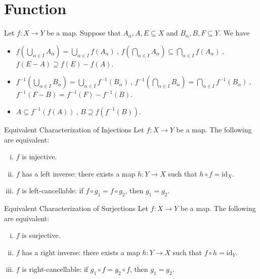 \section{Function}
\begin{proposition}{}{}
Let $f:X\to Y$ be a map. Suppose that $A_\alpha,A,E\subseteq X$ and $B_\alpha,B,F\subseteq Y$. We have
\begin{itemize}


	\item $f\left(\bigcup\limits_{\alpha\in I}A_\alpha\right)=\bigcup\limits_{\alpha\in I}f\left(A_\alpha\right)\ $, $f\left(\bigcap\limits_{\alpha\in I}A_\alpha\right)\subseteq\bigcap\limits_{\alpha\in I}f\left(A_\alpha\right)\ $, $f(E-A)\supseteq f(E)-f(A)$.
	\item $f^{-1}\left(\bigcup\limits_{\alpha\in I}B_\alpha\right)=\bigcup\limits_{\alpha\in I}f^{-1}\left(B_\alpha\right)\ $, $f^{-1}\left(\bigcap\limits_{\alpha\in I}B_\alpha\right)=\bigcap\limits_{\alpha\in I}f^{-1}\left(B_\alpha\right)\ $, $f^{-1}(F-B)=f^{-1}(F)-f^{-1}(B)$.
	\item $A\subseteq f^{-1}(f(A))\ $, $B\supseteq f(f^{-1}(B))$.
\end{itemize}
\end{proposition}

\begin{proposition}{Equivalent Characterization of Injections}{}
    Let $f:X\to Y$ be a map. The following are equivalent:
    \begin{enumerate}[(i)]
        \item $f$ is injective.
        \item $f$ has a left inverse: there exists a map $h:Y\to X$ such that $h\circ f=\mathrm{id}_X$.
        \item $f$ is left-cancellable: if $f\circ g_1=f\circ g_2$, then $g_1=g_2$.
    \end{enumerate}
\end{proposition}

\begin{proposition}{Equivalent Characterization of Surjections}{}
    Let $f:X\to Y$ be a map. The following are equivalent:
    \begin{enumerate}[(i)]
        \item $f$ is surjective.
        \item $f$ has a right inverse: there exists a map $h:Y\to X$ such that $f\circ h=\mathrm{id}_Y$.
        \item $f$ is right-cancellable: if $g_1\circ f=g_2\circ f$, then $g_1=g_2$.
    \end{enumerate}
\end{proposition}


